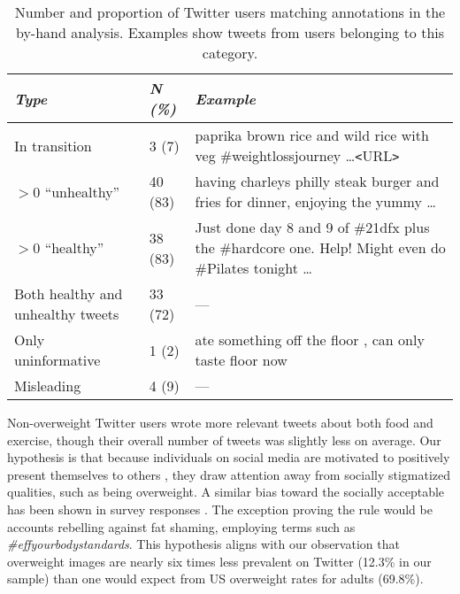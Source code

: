 \begin{table}
\centering\small\renewcommand{\arraystretch}{1.5}
\begin{tabular}{p{2.25cm} l p{3.5cm}}
\toprule
\textit{Type}	& \textit{N (\%)}	& \textit{Example}	\\
\midrule
In transition	& 3 (7)	& paprika brown rice and wild rice with veg \#weightlossjourney \ldots \texttt{<}URL\texttt{>} \\ %
$>0$ ``unhealthy''	& 40 (83)	& having charleys philly steak burger and fries for dinner, enjoying the yummy \ldots \\ %
$>0$ ``healthy'' & 38 (83)	& Just done day 8 and 9 of \#21dfx plus the \#hardcore one. Help! Might even do \#Pilates tonight \ldots \\ %
Both healthy and unhealthy tweets	& 33 (72)	& --- \\
Only uninformative	& 1 (2)	& ate something off the floor , can only taste floor now	\\
Misleading	& 4 (9)	& --- \\
\bottomrule
\end{tabular}
\caption{{\small Number and proportion of Twitter users matching annotations in the by-hand analysis. Examples show tweets from users belonging to this category.}} %
\label{tab:byhandanalysis}
\vspace{-3mm}
\renewcommand{\arraystretch}{1}
\end{table}

Non-overweight Twitter users wrote more relevant tweets about both food and exercise, though their overall number of tweets was slightly less on average. Our hypothesis is that because individuals on social media are motivated to positively present themselves to others \cite{walther2007selective}, they %
draw attention away from socially stigmatized qualities, such as being overweight. A similar bias toward the socially acceptable has been shown in survey responses \cite{phillips1972some}. The exception proving the rule would be accounts rebelling against fat shaming, employing terms such as \textit{\#effyourbodystandards}. This hypothesis %
aligns with our observation that overweight images are nearly six times less prevalent on Twitter (12.3\% in our sample) than one would expect from US overweight rates for adults (69.8\%).

